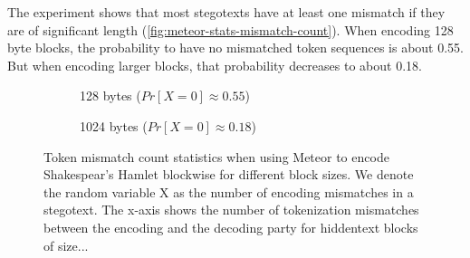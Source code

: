 The experiment shows that most stegotexts have at least one mismatch if they are of significant length (\autoref{fig:meteor-stats-mismatch-count}).
When encoding 128 byte blocks, the probability to have no mismatched token sequences is about 0.55.
But when encoding larger blocks, that probability decreases to about 0.18.

\begin{figure}[htbp]%
	\begin{subfigure}{.5\textwidth}%
		\centering%
	    \resizebox{0.9\linewidth}{!}{%
		}%
		\caption{128 bytes ($Pr[X=0] \approx 0.55$)}%
	\end{subfigure}%
	\begin{subfigure}{.5\textwidth}%
		\centering%
	    \resizebox{0.9\linewidth}{!}{%
		}%
		\caption{1024 bytes ($Pr[X=0] \approx 0.18$)}%
	\end{subfigure}%
	\caption{
	Token mismatch count statistics when using Meteor to encode Shakespear's Hamlet blockwise for different block sizes.
	We denote the random variable X as the number of encoding mismatches in a stegotext.
	The x-axis shows the number of tokenization mismatches between the encoding and the decoding party for hiddentext blocks of size...}
	\label{fig:meteor-stats-mismatch-count}	
\end{figure}



